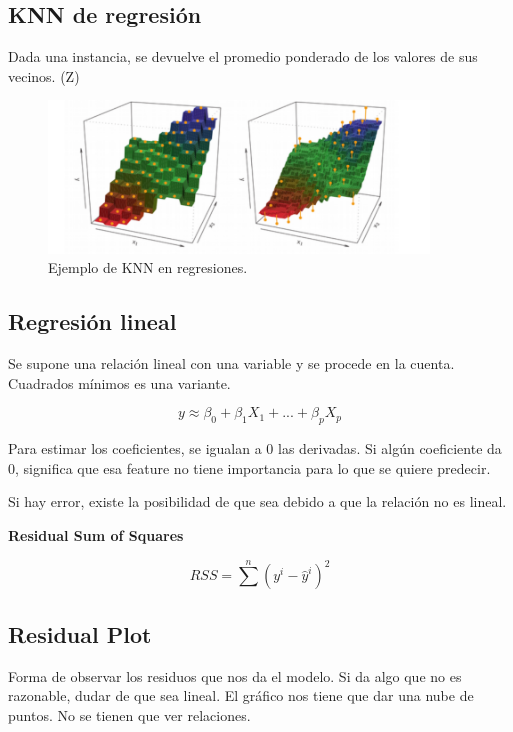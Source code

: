 \documentclass[titlepage,a4paper]{article}
\begin{document}
\subsection{KNN de regresión}
Dada una instancia, se devuelve el promedio ponderado de los valores de sus vecinos. (Z)

\begin{figure}[!htb]
    \centering
    \includegraphics[width=0.9\textwidth]{imagenesResumen/KNNRegresion.PNG}
    \caption{Ejemplo de KNN en regresiones.}
\end{figure}

\subsection{Regresión lineal}
Se supone una relación lineal con una variable y se procede en la cuenta. Cuadrados mínimos es una variante.

\begin{equation}
    y \approx \beta_0 + \beta_1 X_1 + ... + \beta_p X_p
\end{equation}

Para estimar los coeficientes, se igualan a 0 las derivadas. Si algún coeficiente da 0, significa que esa feature no tiene importancia para lo que se quiere predecir.

Si hay error, existe la posibilidad de que sea debido a que la relación no es lineal.

\textbf{Residual Sum of Squares}

\begin{equation}
    RSS = \sum^{n} (y^{i}-\hat{y}^{i})^{2}
\end{equation}


\subsection{Residual Plot}

Forma de observar los residuos que nos da el modelo. Si da algo que no es razonable, dudar de que sea lineal. El gráfico nos tiene que dar una nube de puntos. No se tienen que ver relaciones.
\end{document}
